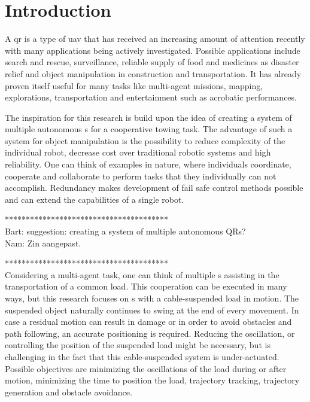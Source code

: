 \chapter{Introduction} \label{ch:intro}
A \acf{qr} is a type of \acf{uav} that has received an increasing amount of attention recently with many applications being actively investigated. Possible applications include search and rescue, surveillance, reliable supply of food and medicines as disaster relief and object manipulation in construction and transportation. It has already proven itself useful for many tasks like multi-agent missions, mapping, explorations, transportation and entertainment such as acrobatic performances.

The inspiration for this research is build upon the idea of creating a system of multiple autonomous s for a cooperative towing task. The advantage of such a system for object manipulation is the possibility to reduce complexity of the individual robot, decrease cost over traditional robotic systems and high reliability. One can think of examples in nature, where individuals coordinate, cooperate and collaborate to perform tasks that they individually can not accomplish. Redundancy makes development of fail safe control methods possible and can extend the capabilities of a single robot. 						

***************************************\\
Bart: suggestion: creating a system of multiple autonomous QRs?\\
Nam: Zin aangepast.

***************************************\\

Considering a multi-agent task, one can think of multiple s assisting in the transportation of a common load. This cooperation can be executed in many ways, but this research focuses on s with a cable-suspended load in motion. The suspended object naturally continues to swing at the end of every movement. In case a residual motion can result in damage or in order to avoid obstacles and path following, an accurate positioning is required. Reducing the oscillation, or controlling the position of the suspended load might be necessary, but is challenging in the fact that this cable-suspended system is under-actuated. Possible objectives are minimizing the oscillations of the load during or after motion, minimizing the time to position the load, trajectory tracking, trajectory generation and obstacle avoidance.

